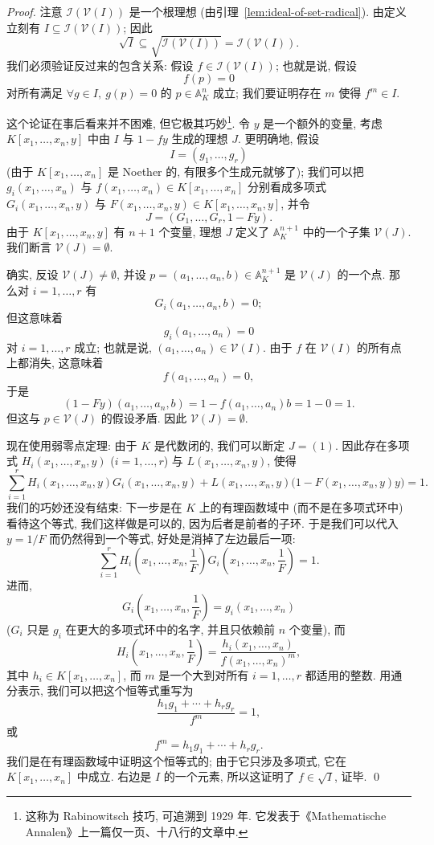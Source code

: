 \begin{proof}
注意 $\mathcal{I}(\mathcal{V}(I))$ 是一个根理想 (由引理~\ref{lem:ideal-of-set-radical}). 由定义立刻有 $I\subseteq\mathcal{I}(\mathcal{V}(I))$; 因此
\[
\sqrt{I}\subseteq\sqrt{\mathcal{I}(\mathcal{V}(I))}=\mathcal{I}(\mathcal{V}(I)).
\]
我们必须验证反过来的包含关系: 假设 $f\in\mathcal{I}(\mathcal{V}(I))$; 也就是说, 假设
\[
f(p)=0
\]
对所有满足 $\forall g\in I,\ g(p)=0$ 的 $p\in\mathbb{A}_K^n$ 成立; 我们要证明存在 $m$ 使得 $f^m\in I$.

这个论证在事后看来并不困难, 但它极其巧妙\footnote{这称为 Rabinowitsch 技巧, 可追溯到 1929 年. 它发表于《Mathematische Annalen》上一篇仅一页、十八行的文章中.}. 令 $y$ 是一个额外的变量, 考虑 $K[x_1,\ldots ,x_n,y]$ 中由 $I$ 与 $1-fy$ 生成的理想 $J$. 更明确地, 假设
\[
I=(g_1,\ldots ,g_r)
\]
(由于 $K[x_1,\ldots ,x_n]$ 是 Noether 的, 有限多个生成元就够了); 我们可以把 $g_i(x_1,\ldots ,x_n)$ 与 $f(x_1,\ldots ,x_n)\in K[x_1,\ldots ,x_n]$ 分别看成多项式 $G_i(x_1,\ldots ,x_n,y)$ 与 $F(x_1,\ldots ,x_n,y)\in K[x_1,\ldots ,x_n,y]$, 并令
\[
J=(G_1,\ldots ,G_r,1-Fy).
\]
由于 $K[x_1,\ldots ,x_n,y]$ 有 $n+1$ 个变量, 理想 $J$ 定义了 $\mathbb{A}_K^{n+1}$ 中的一个子集 $\mathcal{V}(J)$. 我们断言 $\mathcal{V}(J)=\emptyset$.

确实, 反设 $\mathcal{V}(J)\neq\emptyset$, 并设 $p=(a_1,\ldots ,a_n,b)\in\mathbb{A}_K^{n+1}$ 是 $\mathcal{V}(J)$ 的一个点. 那么对 $i=1,\ldots ,r$ 有
\[
G_i(a_1,\ldots ,a_n,b)=0;
\]
但这意味着
\[
g_i(a_1,\ldots ,a_n)=0
\]
对 $i=1,\ldots ,r$ 成立; 也就是说, $(a_1,\ldots ,a_n)\in\mathcal{V}(I)$. 由于 $f$ 在 $\mathcal{V}(I)$ 的所有点上都消失, 这意味着
\[
f(a_1,\ldots ,a_n)=0,
\]
于是
\[
(1-Fy)(a_1,\ldots ,a_n,b)=1-f(a_1,\ldots ,a_n)b=1-0=1.
\]
但这与 $p\in\mathcal{V}(J)$ 的假设矛盾. 因此 $\mathcal{V}(J)=\emptyset$.

现在使用弱零点定理: 由于 $K$ 是代数闭的, 我们可以断定 $J=(1)$. 因此存在多项式 $H_i(x_1,\ldots ,x_n,y)$ ($i=1,\ldots ,r$) 与 $L(x_1,\ldots ,x_n,y)$, 使得
\[
\sum_{i=1}^{r}H_i(x_1,\ldots ,x_n,y)G_i(x_1,\ldots ,x_n,y)+L(x_1,\ldots ,x_n,y)\bigl(1-F(x_1,\ldots ,x_n,y)y\bigr)=1.
\]
我们的巧妙还没有结束: 下一步是在 $K$ 上的有理函数域中 (而不是在多项式环中) 看待这个等式, 我们这样做是可以的, 因为后者是前者的子环. 于是我们可以代入 $y=1/F$ 而仍然得到一个等式, 好处是消掉了左边最后一项:
\[
\sum_{i=1}^{r}H_i\left(x_1,\ldots ,x_n,\frac{1}{F}\right)G_i\left(x_1,\ldots ,x_n,\frac{1}{F}\right)=1.
\]
进而,
\[
G_i\left(x_1,\ldots ,x_n,\frac{1}{F}\right)=g_i(x_1,\ldots ,x_n)
\]
($G_i$ 只是 $g_i$ 在更大的多项式环中的名字, 并且只依赖前 $n$ 个变量), 而
\[
H_i\left(x_1,\ldots ,x_n,\frac{1}{F}\right)=\frac{h_i(x_1,\ldots ,x_n)}{f(x_1,\ldots ,x_n)^m},
\]
其中 $h_i\in K[x_1,\ldots ,x_n]$, 而 $m$ 是一个大到对所有 $i=1,\ldots ,r$ 都适用的整数. 用通分表示, 我们可以把这个恒等式重写为
\[
\frac{h_1g_1+\cdots +h_rg_r}{f^m}=1,
\]
或
\[
f^m=h_1g_1+\cdots +h_rg_r.
\]
我们是在有理函数域中证明这个恒等式的; 由于它只涉及多项式, 它在 $K[x_1,\ldots ,x_n]$ 中成立. 右边是 $I$ 的一个元素, 所以这证明了 $f\in\sqrt{I}$, 证毕. \qed
\end{proof}

